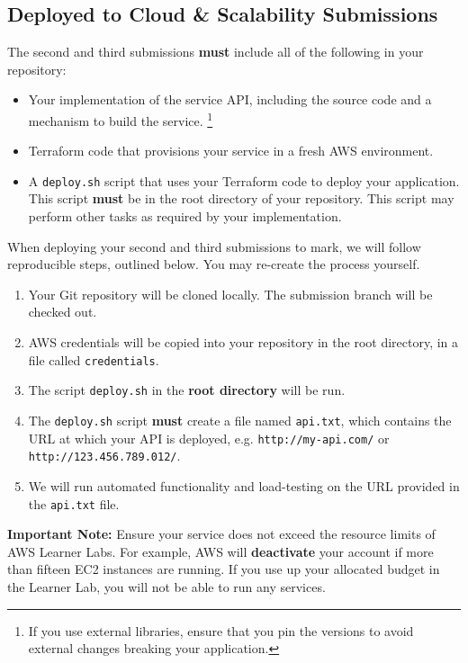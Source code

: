 \documentclass{csse4400}
\begin{document}
\newpage
\begin{samepage}
\subsection{Deployed to Cloud \& Scalability Submissions}
The second and third submissions \textbf{must} include all of the following in your repository:
\begin{itemize}
  \item Your implementation of the service API, including the source code and a mechanism to build the service.%
        \footnote{If you use external libraries,
                  ensure that you pin the versions to avoid external changes breaking your application.}
  \item Terraform code that provisions your service in a fresh AWS environment.
  \item A \texttt{deploy.sh} script that uses your Terraform code to deploy your application.
        This script \textbf{must} be in the root directory of your repository.
        This script may perform other tasks as required by your implementation.
\end{itemize}
\end{samepage}

\noindent
When deploying your second and third submissions to mark, we will follow reproducible steps, outlined below.
You may re-create the process yourself.

\begin{enumerate}
  \item Your Git repository will be cloned locally.
        The submission branch will be checked out.
  \item AWS credentials will be copied into your repository in the root directory,
        in a file called \texttt{credentials}.
  \item The script \texttt{deploy.sh} in the \textbf{root directory} will be run.
  \item The \texttt{deploy.sh} script \textbf{must} create a file named \texttt{api.txt},
        which contains the URL at which your API is deployed,
        e.g. \texttt{http://my-api.com/} or \texttt{http://123.456.789.012/}.
  \item We will run automated functionality and load-testing on the URL provided in the \texttt{api.txt} file.
\end{enumerate}

\noindent
\textbf{Important Note:} Ensure your service does not exceed the resource limits of AWS Learner Labs.
For example, AWS will \textbf{deactivate} your account if more than fifteen EC2 instances are running.
If you use up your allocated budget in the Learner Lab, you will not be able to run any services.
\end{document}
